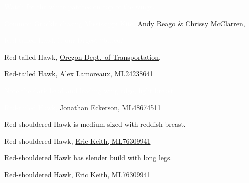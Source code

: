 \documentclass[t]{beamer}
\begin{document}
{
\begin{frame}{\textcolor{white}{Watch for the white patches on top of the wings.}}


\tinyfill \textcolor{white}{Common Grackle chasing Mississippi Kite, \href{https://flickr.com/photos/wildreturn/28138609132}{Andy Reago \& Chrissy McClarren, }}
\end{frame}
}

{
\begin{frame}{\textcolor{white}{Red-tailed Hawk is our largest “buteo.”}}


\tinyfill Red-tailed Hawk, \href{https://flickr.com/photos/oregondot/5396663758}{Oregon Dept.~of Transportation, }
\end{frame}
}

{
\begin{frame}


\tinyfill Red-tailed Hawk, \href{https://macaulaylibrary.org/asset/24238641}{Alex Lamoreaux, ML24238641}
\end{frame}
}


{
\begin{frame}{\textcolor{white}{Note the dark head and leading wing edge, light breast.}}


\tinyfill \textcolor{white}{Red-tailed Hawk, \href{https://macaulaylibrary.org/asset/48674511}{Jonathan Eckerson, ML48674511}}
\end{frame}
}

{
\begin{frame}{Red-shouldered Hawk is medium-sized with reddish breast.}


\tinyfill Red-shouldered Hawk, \href{https://macaulaylibrary.org/asset/76309941}{Eric Keith, ML76309941}
\end{frame}
}

{
\begin{frame}{Red-shouldered Hawk has slender build with long legs.}


\tinyfill Red-shouldered Hawk, \href{https://macaulaylibrary.org/asset/76309941}{Eric Keith, ML76309941}
\end{frame}
}
\end{document}
